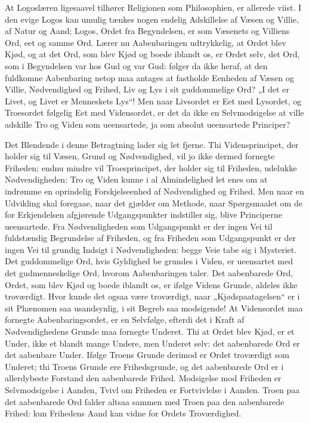 \documentclass[12pt]{book}
\begin{document}
At Logoslæren ligesaavel tilhører Religionen som Philosophien, er
allerede viist. I den evige Logos kan umulig tænkes nogen endelig
Adskillelse af Væsen og Villie, af Natur og Aand; Logos, Ordet fra
Begyndelsen, er som Væsenets og Villiens Ord, eet og samme Ord.
Lærer nu Aabenbaringen udtrykkelig, at Ordet blev Kjød, og at det
Ord, som blev Kjød og boede iblandt os, er Ordet selv, det Ord, som
i Begyndelsen var hos Gud og var Gud: følger da ikke heraf, at den
fuldkomne Aabenbaring netop maa antages at fastholde Eenheden af
Væsen og Villie, Nødvendighed og Frihed, Liv og Lys i sit
guddommelige Ord? „I det er Livet, og Livet er Menneskets Lys“! Men
naar Livsordet er Eet med Lysordet, og Troesordet følgelig Eet med
Vidensordet, er det da ikke en Selvmodsigelse at ville adskille Tro
og Viden som ueensartede, ja som absolut ueensartede Principer?

Det Blendende i denne Betragtning lader sig let fjerne. Thi
Vidensprincipet, der holder sig til Væsen, Grund og Nødvendighed,
vil jo ikke dermed fornegte Friheden; endnu mindre vil
Troesprincipet, der holder sig til Friheden, udelukke
Nødvendigheden: Tro og Viden kunne i al Almindelighed let enes om at
indrømme en oprindelig Forskjelseenhed af Nødvendighed og Frihed.
Men naar en Udvikling skal foregaae, naar det gjælder om Methode,
naar Spørgsmaalet om de for Erkjendelsen afgjørende Udgangspunkter
indstiller sig, blive Principerne ueensartede. Fra Nødvendigheden
som Udgangspunkt er der ingen Vei til fuldstændig Begrundelse af
Friheden, og fra Friheden som Udgangspunkt er der ingen Vei til
grundig Indsigt i Nødvendigheden: begge Veie tabe sig i Mysteriet.
Det guddommelige Ord, hvis Gyldighed be\-
grundes i Viden, er ueensartet med det gudmenneskelige Ord, hvorom
Aabenbaringen taler. Det aabenbarede Ord, Ordet, som blev Kjød og
boede iblandt os, er ifølge Videns Grunde, aldeles ikke troværdigt.
Hvor kunde det ogsaa være troværdigt, naar „Kjødspaatagelsen“ er i
sit Phænomen saa usandsynlig, i sit Begreb saa modsigende! At
Vidensordet maa fornegte Aabenbaringsordet, er en Selvfølge, efterdi
det i Kraft af Nødvendighedens Grunde maa fornegte Underet. Thi at
Ordet blev Kjød, er et Under, ikke et blandt mange Undere, men
Underet selv: det aabenbarede Ord er det aabenbare Under. Ifølge
Troens Grunde derimod er Ordet troværdigt som Underet; thi Troens
Grunde ere Frihedsgrunde, og det aabenbarede Ord er i allerdybeste
Forstand den aabenbarede Frihed. Modsigelse mod Friheden er
Selvmodsigelse i Aanden, Tvivl om Friheden er Fortvivlelse i
Aanden. Troen paa det aabenbarede Ord falder altsaa sammen med Troen
paa den aabenbarede Frihed: kun Frihedens Aand kan vidne for Ordets
Troværdighed.
\end{document}
